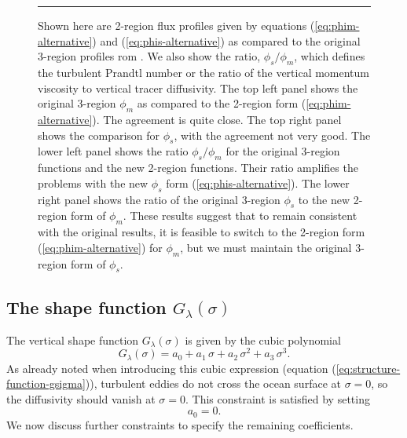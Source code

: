 \begin{figure}[h!t]
\begin{center}
\caption[Alternative similarity functions]{\sf Shown here are 2-region
  flux profiles given by equations (\ref{eq:phim-alternative}) and
  (\ref{eq:phis-alternative}) as compared to the original 3-region
  profiles rom \cite{LargeKPP}.  We also show the ratio,
  $\phi_{s}/\phi_{m}$, which defines the turbulent Prandtl number or
  the ratio of the vertical momentum viscosity to vertical tracer
  diffusivity.  The top left panel shows the original 3-region
  $\phi_{m}$ as compared to the 2-region form
  (\ref{eq:phim-alternative}).  The agreement is quite close.  The top
  right panel shows the comparison for $\phi_{s}$, with the agreement
  not very good. The lower left panel shows the ratio
  $\phi_{s}/\phi_{m}$ for the original 3-region functions and the new
  2-region functions.  Their ratio amplifies the problems with the new
  $\phi_{s}$ form (\ref{eq:phis-alternative}).  The lower right panel
  shows the ratio of the original 3-region $\phi_{s}$ to the new
  2-region form of $\phi_{m}$.  These results suggest that to remain
  consistent with the original \cite{LargeKPP} results, it is feasible
  to switch to the 2-region form (\ref{eq:phim-alternative}) for
  $\phi_{m}$, but we must maintain the original 3-region form of
  $\phi_{s}$.}
\label{fig:phi-alternative-kpp}
\end{center}
\rule{\textwidth}{0.005in}
\end{figure}


\subsection{The shape function $G_{\lambda}(\sigma)$}
\label{subsection:kpp-shape-function}

The vertical shape function $G_{\lambda}(\sigma)$ is given by the cubic
polynomial 
\begin{equation}
 G_{\lambda}(\sigma) = a_{0} + a_{1} \, \sigma + a_{2} \, \sigma^{2} + a_{3} \, \sigma^{3}.
\label{eq:structure-function-gsigma-again}
\end{equation}
As already noted when introducing this cubic expression (equation
(\ref{eq:structure-function-gsigma})), turbulent eddies do not cross
the ocean surface at $\sigma=0$, so the diffusivity should vanish at
$\sigma=0$.  This constraint is satisfied by setting
\begin{equation}
 a_{0} = 0.
\end{equation}
We now discuss further constraints to specify the remaining
coefficients.  


